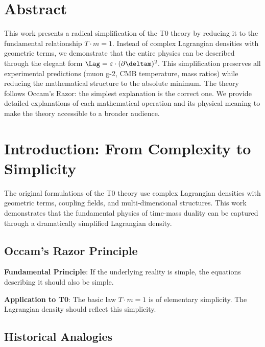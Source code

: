 \hfuzz=200pt
\allowdisplaybreaks

\section*{Abstract}
		This work presents a radical simplification of the T0 theory by reducing it to the fundamental relationship $T \cdot m = 1$. Instead of complex Lagrangian densities with geometric terms, we demonstrate that the entire physics can be described through the elegant form $\Lag = \varepsilon \cdot (\partial \deltam)^2$. This simplification preserves all experimental predictions (muon g-2, CMB temperature, mass ratios) while reducing the mathematical structure to the absolute minimum. The theory follows Occam's Razor: the simplest explanation is the correct one. We provide detailed explanations of each mathematical operation and its physical meaning to make the theory accessible to a broader audience.

	

	\section{Introduction: From Complexity to Simplicity}
	
	The original formulations of the T0 theory use complex Lagrangian densities with geometric terms, coupling fields, and multi-dimensional structures. This work demonstrates that the fundamental physics of time-mass duality can be captured through a dramatically simplified Lagrangian density.
	
	\subsection{Occam's Razor Principle}
	
	\begin{tcolorbox}[colback=blue!5!white,colframe=blue!75!black,title=Occam's Razor in Physics]
		\textbf{Fundamental Principle}: If the underlying reality is simple, the equations describing it should also be simple.
		
		\textbf{Application to T0}: The basic law $T \cdot m = 1$ is of elementary simplicity. The Lagrangian density should reflect this simplicity.
	\end{tcolorbox}
	
	\subsection{Historical Analogies}
	
